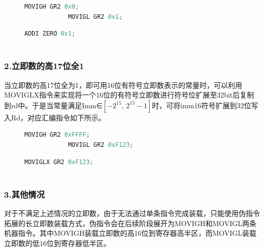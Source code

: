 \begin{figure}[htbp]
	\centering
	\begin{minipage}[t]{0.48\linewidth}
		\captionsetup{type=lstlisting}
		\begin{lstlisting}[language=C++]
			MOVIGH GR2 0x0;
			MOVIGL GR2 0x1;
		\end{lstlisting}
	\end{minipage}\hfill
	\begin{minipage}[t]{0.48\linewidth}
		\captionsetup{type=lstlisting}
		\begin{lstlisting}[language=C++]
			ADDI ZERO 0x1;
			
		\end{lstlisting}
	\end{minipage}
\end{figure}


\subsubsection{2.立即数的高17位全1}
当立即数的高17位全为1，即可用16位有符号立即数表示的常量时，可以利用MOVIGLX指令来实现将一个16位的有符号立即数进行符号位扩展至32bit后复制到rd中。于是当常量满足Imm∈\([-2^{15},\, 2^{15}-1]\)时，可将imm16符号扩展到32位写入Rd，对应汇编指令如下所示。

\begin{figure}[htbp]
	\centering
	\begin{minipage}[t]{0.48\linewidth}
		\captionsetup{type=lstlisting}
		\begin{lstlisting}[language=C++]
			MOVIGH GR2 0xFFFF;
			MOVIGL GR2 0xF123;
		\end{lstlisting}
	\end{minipage}\hfill
	\begin{minipage}[t]{0.48\linewidth}
		\captionsetup{type=lstlisting}
		\begin{lstlisting}[language=C++]
			MOVIGLX GR2 0xF123;
			
		\end{lstlisting}
	\end{minipage}
\end{figure}


\subsubsection{3.其他情况}
对于不满足上述情况的立即数，由于无法通过单条指令完成装载，只能使用伪指令拓展的长立即数装载方式，伪指令会在后续阶段展开为MOVIGH和MOVIGL两条机器指令。其中MOVIGH装载立即数的高16位到寄存器高半区，而MOVIGL装载立即数的低16位到寄存器低半区。

